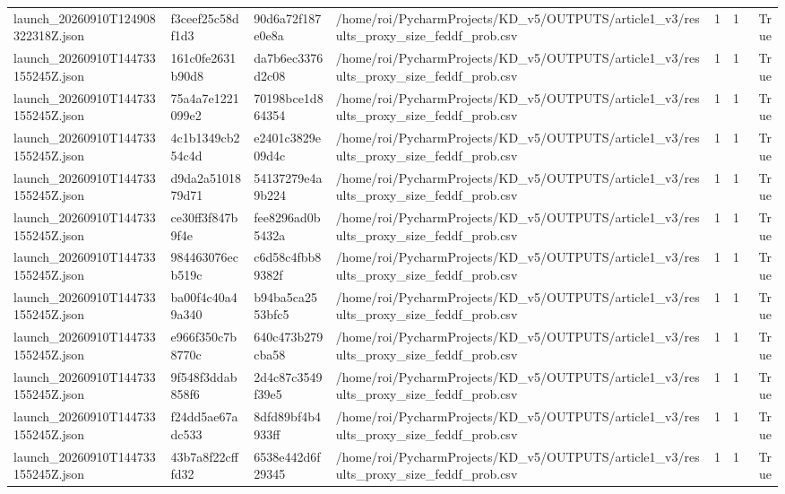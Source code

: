 \begin{tabular}{llllrrr}
launch\_20260910T124908322318Z.json & f3ceef25c58df1d3 & 90d6a72f187e0e8a & /home/roi/PycharmProjects/KD\_v5/OUTPUTS/article1\_v3/results\_proxy\_size\_feddf\_prob.csv & 1 & 1 & True \\
launch\_20260910T144733155245Z.json & 161c0fe2631b90d8 & da7b6ec3376d2c08 & /home/roi/PycharmProjects/KD\_v5/OUTPUTS/article1\_v3/results\_proxy\_size\_feddf\_prob.csv & 1 & 1 & True \\
launch\_20260910T144733155245Z.json & 75a4a7e1221099e2 & 70198bce1d864354 & /home/roi/PycharmProjects/KD\_v5/OUTPUTS/article1\_v3/results\_proxy\_size\_feddf\_prob.csv & 1 & 1 & True \\
launch\_20260910T144733155245Z.json & 4c1b1349cb254c4d & e2401c3829e09d4c & /home/roi/PycharmProjects/KD\_v5/OUTPUTS/article1\_v3/results\_proxy\_size\_feddf\_prob.csv & 1 & 1 & True \\
launch\_20260910T144733155245Z.json & d9da2a5101879d71 & 54137279e4a9b224 & /home/roi/PycharmProjects/KD\_v5/OUTPUTS/article1\_v3/results\_proxy\_size\_feddf\_prob.csv & 1 & 1 & True \\
launch\_20260910T144733155245Z.json & ce30ff3f847b9f4e & fee8296ad0b5432a & /home/roi/PycharmProjects/KD\_v5/OUTPUTS/article1\_v3/results\_proxy\_size\_feddf\_prob.csv & 1 & 1 & True \\
launch\_20260910T144733155245Z.json & 984463076ecb519c & c6d58c4fbb89382f & /home/roi/PycharmProjects/KD\_v5/OUTPUTS/article1\_v3/results\_proxy\_size\_feddf\_prob.csv & 1 & 1 & True \\
launch\_20260910T144733155245Z.json & ba00f4c40a49a340 & b94ba5ca2553bfc5 & /home/roi/PycharmProjects/KD\_v5/OUTPUTS/article1\_v3/results\_proxy\_size\_feddf\_prob.csv & 1 & 1 & True \\
launch\_20260910T144733155245Z.json & e966f350c7b8770c & 640c473b279cba58 & /home/roi/PycharmProjects/KD\_v5/OUTPUTS/article1\_v3/results\_proxy\_size\_feddf\_prob.csv & 1 & 1 & True \\
launch\_20260910T144733155245Z.json & 9f548f3ddab858f6 & 2d4c87c3549f39e5 & /home/roi/PycharmProjects/KD\_v5/OUTPUTS/article1\_v3/results\_proxy\_size\_feddf\_prob.csv & 1 & 1 & True \\
launch\_20260910T144733155245Z.json & f24dd5ae67adc533 & 8dfd89bf4b4933ff & /home/roi/PycharmProjects/KD\_v5/OUTPUTS/article1\_v3/results\_proxy\_size\_feddf\_prob.csv & 1 & 1 & True \\
launch\_20260910T144733155245Z.json & 43b7a8f22cfffd32 & 6538e442d6f29345 & /home/roi/PycharmProjects/KD\_v5/OUTPUTS/article1\_v3/results\_proxy\_size\_feddf\_prob.csv & 1 & 1 & True \\

\end{tabular}
